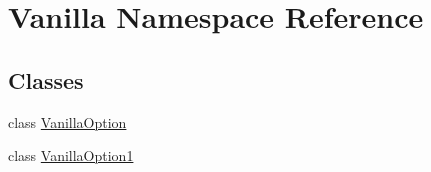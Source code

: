 \hypertarget{namespaceVanilla}{}\section{Vanilla Namespace Reference}
\label{namespaceVanilla}
\subsection*{Classes}
\begin{DoxyCompactItemize}
\item 
class \hyperlink{classVanilla_1_1VanillaOption}{Vanilla\+Option}
\item 
class \hyperlink{classVanilla_1_1VanillaOption1}{Vanilla\+Option1}
\end{DoxyCompactItemize}
